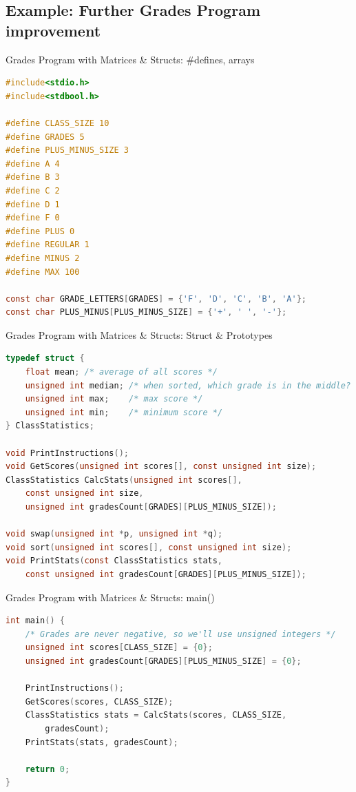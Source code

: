 \documentclass[graphics]{beamer}
\begin{document}
\subsection{Example: Further Grades Program improvement}
\begin{frame}[fragile]{Grades Program with Matrices \& Structs: \#defines, arrays}
    \begin{lstlisting}[language=C,basicstyle=\scriptsize,keywordstyle=\color{blue},commentstyle=\color{green},showstringspaces=false,stringstyle=\color{red}]
#include<stdio.h>
#include<stdbool.h>

#define CLASS_SIZE 10
#define GRADES 5
#define PLUS_MINUS_SIZE 3
#define A 4
#define B 3
#define C 2
#define D 1
#define F 0
#define PLUS 0
#define REGULAR 1
#define MINUS 2
#define MAX 100

const char GRADE_LETTERS[GRADES] = {'F', 'D', 'C', 'B', 'A'};
const char PLUS_MINUS[PLUS_MINUS_SIZE] = {'+', ' ', '-'};
    \end{lstlisting}
\end{frame}

\begin{frame}[fragile]{Grades Program with Matrices \& Structs: Struct \& Prototypes}
    \begin{lstlisting}[language=C,basicstyle=\scriptsize,keywordstyle=\color{blue},commentstyle=\color{green},showstringspaces=false,stringstyle=\color{red}]
typedef struct {
    float mean; /* average of all scores */
    unsigned int median; /* when sorted, which grade is in the middle? */
    unsigned int max;    /* max score */
    unsigned int min;    /* minimum score */
} ClassStatistics;

void PrintInstructions();
void GetScores(unsigned int scores[], const unsigned int size);
ClassStatistics CalcStats(unsigned int scores[],
    const unsigned int size,
    unsigned int gradesCount[GRADES][PLUS_MINUS_SIZE]);

void swap(unsigned int *p, unsigned int *q);
void sort(unsigned int scores[], const unsigned int size);
void PrintStats(const ClassStatistics stats,
    const unsigned int gradesCount[GRADES][PLUS_MINUS_SIZE]);
    \end{lstlisting}
\end{frame}

\begin{frame}[fragile]{Grades Program with Matrices \& Structs: main()}
    \begin{lstlisting}[language=C,basicstyle=\scriptsize,keywordstyle=\color{blue},commentstyle=\color{green},showstringspaces=false,stringstyle=\color{red}]
int main() {
    /* Grades are never negative, so we'll use unsigned integers */
    unsigned int scores[CLASS_SIZE] = {0};
    unsigned int gradesCount[GRADES][PLUS_MINUS_SIZE] = {0};

    PrintInstructions();
    GetScores(scores, CLASS_SIZE);
    ClassStatistics stats = CalcStats(scores, CLASS_SIZE,
        gradesCount);
    PrintStats(stats, gradesCount);

    return 0;
}
    \end{lstlisting}
\end{frame}
\end{document}
